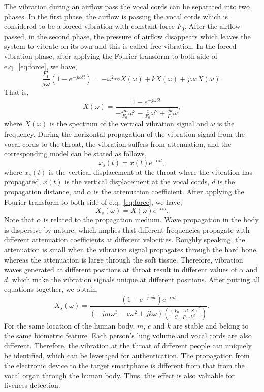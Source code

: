 The vibration during an airflow pass the vocal cords can be separated into two phases. In the first phase, the airflow is passing the vocal cords which is considered to be a forced vibration with constant force $F_0$. After the airflow passed, in the second phase, the pressure of airflow disappears which leaves the system to vibrate on its own and this is called free vibration. In the forced vibration phase, after applying the Fourier transform to both side of e.q.~\eqref{eq:force}, we have,
\begin{displaymath}
\frac{F_0}{j \omega}(1-e^{-j\omega \delta t}) = - \omega^2 m X(\omega) + k X(\omega) + j \omega c X(\omega).
\end{displaymath}
That is,
\begin{displaymath}
X(\omega) = \frac{1-e^{-j\omega \delta t}}{-\frac{j m}{F_0} \omega^3 - \frac{c}{F_0} \omega^2 + \frac{j k}{F_0} \omega},
\end{displaymath}
where $X(\omega)$ is the spectrum of the vertical vibration signal and $\omega$ is the frequency. 
During the horizontal propagation of the vibration signal from the vocal cords to the throat, the vibration suffers from attenuation, and the corresponding model can be stated as follows,
\begin{displaymath}
x_s(t) = x(t) e^{-\alpha d},
\end{displaymath}
where $x_s(t)$ is the vertical displacement at the throat where the vibration has propagated, $x(t)$ is the vertical displacement at the vocal cords, $d$ is the propagation distance, and $\alpha$ is the attenuation coefficient. 
After applying the Fourier transform to both side of e.q.~\eqref{eq:force}, we have,
\begin{displaymath}
X_s(\omega) = X(\omega) e^{-\alpha d}.
\end{displaymath}
Note that $\alpha$ is related to the propagation medium. Wave propagation in the body is dispersive by nature, which implies that different frequencies propagate with different attenuation coefficients at different velocities. Roughly speaking, the attenuation is small when the vibration signal propagates through the hard bone, whereas the attenuation is large through the soft tissue. Therefore, vibration waves generated at different positions at throat result in different values of $\alpha$ and $d$, which make the vibration signals unique at different positions. 
After putting all equations together, we obtain,
\begin{displaymath}
X_s(\omega) = \frac{(1-e^{-j\omega \delta t}) e^{-\alpha d}}{(-jm\omega^3 - c \omega^2 + jk\omega)(\frac{(V_0 - d \cdot S)^\gamma}{S_v \cdot P_0 \cdot V^\gamma_0 })}.
\end{displaymath}
For the same location of the human body, $m$, $c$ and $k$ are stable and belong to the same biometric feature. Each person’s lung volume and vocal cords are also different. Therefore, the vibration at the throat of different people can uniquely be identified, which can be leveraged for authentication. The propagation from the electronic device to the target smartphone is different from that from the vocal organ through the human body. Thus, this effect is also valuable for liveness detection.


